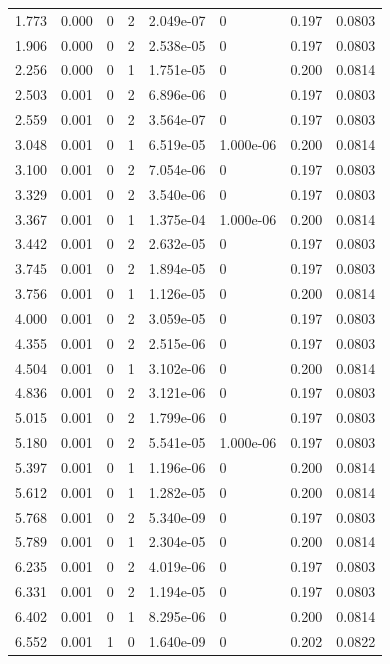 \documentclass[preview]{standalone}
\begin{document}
{{\begin{tabular}{L{1.2cm}C{1.2cm} C{0.3cm}C{0.5cm} C{1.4cm}C{1.4cm} C{1.4cm}C{1.4cm}}
  1.773  &  0.000  & 0     &  2 &  2.049e-07  & 0  & 0.197 &  0.0803   \\ 
  1.906  &  0.000  & 0     &  2 &  2.538e-05  & 0  & 0.197 &  0.0803   \\ 
  2.256  &  0.000  & 0     &  1 &  1.751e-05  & 0  & 0.200 &  0.0814   \\ 
  2.503  &  0.001  & 0     &  2 &  6.896e-06  & 0  & 0.197 &  0.0803   \\ 
  2.559  &  0.001  & 0     &  2 &  3.564e-07  & 0  & 0.197 &  0.0803   \\ 
  3.048  &  0.001  & 0     &  1 &  6.519e-05  & 1.000e-06  & 0.200 &  0.0814   \\ 
  3.100  &  0.001  & 0     &  2 &  7.054e-06  & 0  & 0.197 &  0.0803   \\ 
  3.329  &  0.001  & 0     &  2 &  3.540e-06  & 0  & 0.197 &  0.0803   \\ 
  3.367  &  0.001  & 0     &  1 &  1.375e-04  & 1.000e-06  & 0.200 &  0.0814   \\ 
  3.442  &  0.001  & 0     &  2 &  2.632e-05  & 0  & 0.197 &  0.0803   \\ 
  3.745  &  0.001  & 0     &  2 &  1.894e-05  & 0  & 0.197 &  0.0803   \\ 
  3.756  &  0.001  & 0     &  1 &  1.126e-05  & 0  & 0.200 &  0.0814   \\ 
  4.000  &  0.001  & 0     &  2 &  3.059e-05  & 0  & 0.197 &  0.0803   \\ 
  4.355  &  0.001  & 0     &  2 &  2.515e-06  & 0  & 0.197 &  0.0803   \\ 
  4.504  &  0.001  & 0     &  1 &  3.102e-06  & 0  & 0.200 &  0.0814   \\ 
  4.836  &  0.001  & 0     &  2 &  3.121e-06  & 0  & 0.197 &  0.0803   \\ 
  5.015  &  0.001  & 0     &  2 &  1.799e-06  & 0  & 0.197 &  0.0803   \\ 
  5.180  &  0.001  & 0     &  2 &  5.541e-05  & 1.000e-06  & 0.197 &  0.0803   \\ 
  5.397  &  0.001  & 0     &  1 &  1.196e-06  & 0  & 0.200 &  0.0814   \\ 
  5.612  &  0.001  & 0     &  1 &  1.282e-05  & 0  & 0.200 &  0.0814   \\ 
  5.768  &  0.001  & 0     &  2 &  5.340e-09  & 0  & 0.197 &  0.0803   \\ 
  5.789  &  0.001  & 0     &  1 &  2.304e-05  & 0  & 0.200 &  0.0814   \\ 
  6.235  &  0.001  & 0     &  2 &  4.019e-06  & 0  & 0.197 &  0.0803   \\ 
  6.331  &  0.001  & 0     &  2 &  1.194e-05  & 0  & 0.197 &  0.0803   \\ 
  6.402  &  0.001  & 0     &  1 &  8.295e-06  & 0  & 0.200 &  0.0814   \\ 
  6.552  &  0.001  & 1     &  0 &  1.640e-09  & 0  & 0.202 &  0.0822   \\ 
\hline 
\end{tabular} 

}}
\end{document}
